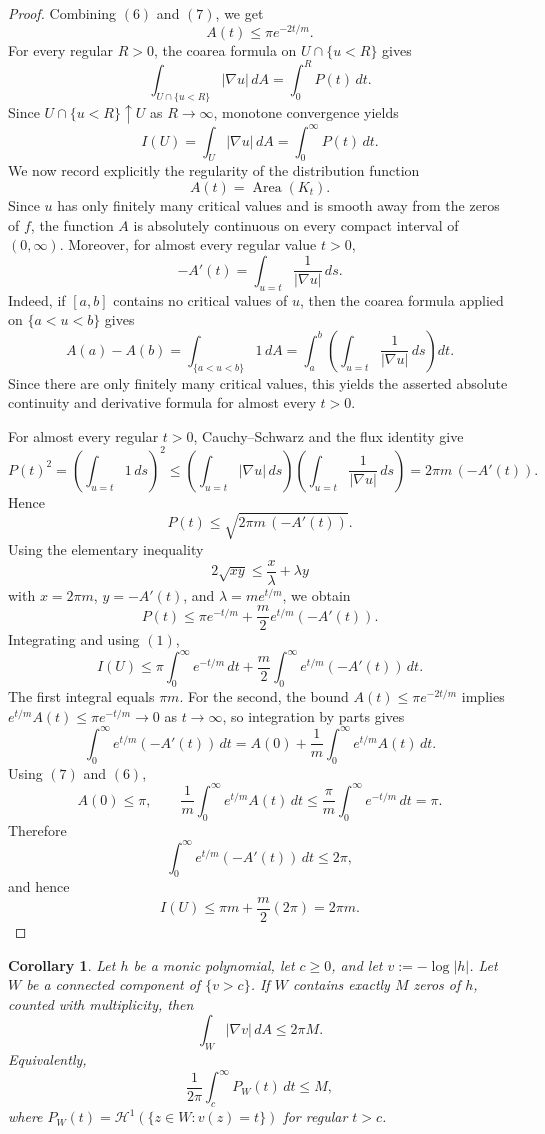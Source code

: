 \documentclass[12pt]{amsart}
\theoremstyle{definition}
\newtheorem{corollary}[theorem]{Corollary}
\theoremstyle{remark}
\begin{document}
\begin{proof}
Combining \((6)\) and \((7)\), we get
\[
A(t)\le \pi e^{-2t/m}.
\]
For every regular $R>0$, the coarea formula on $U\cap\{u<R\}$ gives
\[
\int_{U\cap\{u<R\}} |\nabla u|\,dA
=
\int_0^R P(t)\,dt.
\]
Since $U\cap\{u<R\}\uparrow U$ as $R\to\infty$, monotone convergence yields
\begin{equation}
I(U)=\int_U |\nabla u|\,dA=\int_0^\infty P(t)\,dt.
\tag{1}
\end{equation}
We now record explicitly the regularity of the distribution function
\[
A(t)=\operatorname{Area}(K_t).
\]
Since $u$ has only finitely many critical values and is smooth away from the zeros of
$f$, the function $A$ is absolutely continuous on every compact interval of $(0,\infty)$.
Moreover, for almost every regular value $t>0$,
\[
-A'(t)=\int_{u=t}\frac{1}{|\nabla u|}\,ds.
\]
Indeed, if $[a,b]$ contains no critical values of $u$, then the coarea formula applied
on $\{a<u<b\}$ gives
\[
A(a)-A(b)
=\int_{\{a<u<b\}}1\,dA
=\int_a^b\left(\int_{u=t}\frac{1}{|\nabla u|}\,ds\right)dt.
\]
Since there are only finitely many critical values, this yields the asserted absolute
continuity and derivative formula for almost every $t>0$.

For almost every regular $t>0$, Cauchy--Schwarz and the flux identity give
\[
P(t)^2
=\left(\int_{u=t}1\,ds\right)^2
\le
\left(\int_{u=t}|\nabla u|\,ds\right)
\left(\int_{u=t}\frac{1}{|\nabla u|}\,ds\right)
=
2\pi m\,(-A'(t)).
\]
Hence
\[
P(t)\le \sqrt{2\pi m\,(-A'(t))}. \tag{8}
\]
Using the elementary inequality
\[
2\sqrt{xy}\le \frac{x}{\lambda}+\lambda y
\]
with \(x=2\pi m\), \(y=-A'(t)\), and \(\lambda= m e^{t/m}\), we obtain
\[
P(t)\le \pi e^{-t/m}+\frac{m}{2}e^{t/m}(-A'(t)).
\]
Integrating and using \((1)\),
\[
I(U)\le \pi\int_0^\infty e^{-t/m}\,dt
+\frac{m}{2}\int_0^\infty e^{t/m}(-A'(t))\,dt.
\]
The first integral equals \(\pi m\). For the second, the bound \(A(t)\le \pi e^{-2t/m}\) implies
\(e^{t/m}A(t)\le \pi e^{-t/m}\to 0\) as \(t\to\infty\), so integration by parts gives
\[
\int_0^\infty e^{t/m}(-A'(t))\,dt
=
A(0)+\frac{1}{m}\int_0^\infty e^{t/m}A(t)\,dt.
\]
Using \((7)\) and \((6)\),
\[
A(0)\le \pi,
\qquad
\frac{1}{m}\int_0^\infty e^{t/m}A(t)\,dt
\le
\frac{\pi}{m}\int_0^\infty e^{-t/m}\,dt
=
\pi.
\]
Therefore
\[
\int_0^\infty e^{t/m}(-A'(t))\,dt \le 2\pi,
\]
and hence
\[
I(U)\le \pi m+\frac{m}{2}(2\pi)=2\pi m.
\]
\end{proof}

\medskip
\begin{corollary}\label{cor:component-integral-bound}
\emph{Let $h$ be a monic polynomial, let $c\ge 0$, and let $v:=-\log|h|$. Let $W$ be a connected component of $\{v>c\}$. If $W$
contains exactly $M$ zeros of $h$, counted with multiplicity, then}
\[
\int_W |\nabla v|\,dA\le 2\pi M.
\]
\emph{Equivalently,}
\[
\frac{1}{2\pi}\int_c^{\infty} P_W(t)\,dt\le M,
\]
\emph{where $P_W(t)=\mathcal H^1(\{z\in W:v(z)=t\})$ for regular $t>c$.}
\end{corollary}
\end{document}
